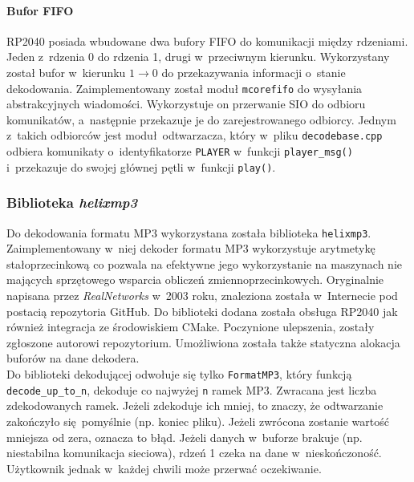 \documentclass[polish]{aghengthesis}
\begin{document}
			\paragraph{Bufor FIFO}
				RP2040 posiada wbudowane dwa bufory FIFO do komunikacji między rdzeniami. Jeden z~rdzenia 0 do rdzenia 1, drugi w~przeciwnym kierunku. Wykorzystany został bufor w~kierunku $1 \rightarrow 0$ do przekazywania informacji o~stanie dekodowania. Zaimplementowany został moduł \lstinline|mcorefifo| do wysyłania abstrakcyjnych wiadomości. Wykorzystuje on przerwanie SIO do odbioru komunikatów, a~następnie przekazuje je do zarejestrowanego odbiorcy. Jednym z~takich odbiorców jest moduł odtwarzacza, który w~pliku \lstinline|decodebase.cpp| odbiera komunikaty o~identyfikatorze \lstinline|PLAYER| w~funkcji \lstinline|player_msg()| i~przekazuje do swojej głównej pętli w~funkcji \lstinline|play()|.
		
		\subsubsection{Biblioteka \textit{helixmp3}}
			Do dekodowania formatu MP3 wykorzystana została biblioteka \lstinline|helixmp3|.
			Zaimplementowany w~niej dekoder formatu MP3 wykorzystuje arytmetykę stałoprzecinkową co pozwala na efektywne jego wykorzystanie na maszynach nie mających sprzętowego wsparcia obliczeń zmiennoprzecinkowych.
			Oryginalnie napisana przez \textit{RealNetworks}\textsuperscript{\cite{realnetworks}} w~2003 roku, znaleziona została w~Internecie pod postacią repozytoria GitHub\textsuperscript{\cite{helixmp3_repo}}. Do biblioteki dodana została obsługa RP2040 jak również integracja ze środowiskiem CMake.
			Poczynione ulepszenia, zostały zgłoszone autorowi repozytorium\textsuperscript{\cite{helixmp3_pr}}. Umożliwiona została także statyczna alokacja buforów na dane dekodera.
			$ $\\
			
			Do biblioteki dekodującej odwołuje się tylko \lstinline|FormatMP3|, który funkcją \lstinline|decode_up_to_n|, dekoduje co najwyżej \lstinline|n| ramek MP3. Zwracana jest liczba zdekodowanych ramek. Jeżeli zdekoduje ich mniej, to znaczy, że odtwarzanie zakończyło się pomyślnie (np. koniec pliku). Jeżeli zwrócona zostanie wartość mniejsza od zera, oznacza to błąd. Jeżeli danych w~buforze brakuje (np. niestabilna komunikacja sieciowa), rdzeń 1 czeka na dane w~nieskończoność. Użytkownik jednak w~każdej chwili może przerwać oczekiwanie.
		
\end{document}
